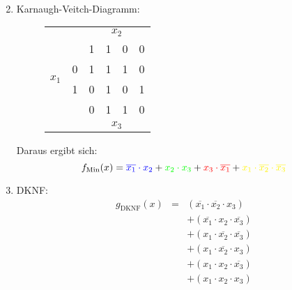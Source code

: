 \documentclass[DIN, pagenumber=false, fontsize=11pt, parskip=half]{scrartcl}
\begin{document}
\begin{enumerate}[label=(\alph*)]
\begin{eqnarray*}
            \end{eqnarray*}
        \item 
            Karnaugh-Veitch-Diagramm:
            \begin{figure}[H]
                \centering
                \begin{tabular}{cc|cccc}
                    & &  & \multicolumn{2}{c}{$x_2$}\\
                    & & 1 & 1 & 0 & 0\\
                    \midrule
                    \multirow{ 2}{*}{$x_1$} & 0 & \cellcolor{blue!25}1 & \cellcolor{mixtureColor!25}1 & \cellcolor{red!25}1 & 0\\
                     & 1 & 0 & \cellcolor{green!25}1 & 0 & \cellcolor{yellow!25}1\\
                    \midrule
                    & & 0 & 1 & 1 & 0\\
                    & &  & \multicolumn{2}{c}{$x_3$}\\
                \end{tabular}
            \end{figure}
            Daraus ergibt sich:
            \begin{equation*}
                f_\text{Min}(x) = \textcolor{blue}{\overline{x_1}\cdot x_2} + 
                \textcolor{green}{x_2 \cdot x_3} + 
                \textcolor{red}{x_3 \cdot \overline{x_1}}+
                \textcolor{yellow}{x_1 \cdot \overline{x_2} \cdot \overline{x_3}}
            \end{equation*}
        \item
            DKNF:
            \begin{eqnarray*}
                g_\text{DKNF}(x) &=& (\overline{x_1} \cdot \overline{x_2} \cdot x_3)\\
                &&+ (\overline{x_1} \cdot x_2 \cdot \overline{x_3})\\
                &&+ (x_1 \cdot \overline{x_2} \cdot \overline{x_3})\\
                &&+ (x_1 \cdot \overline{x_2} \cdot x_3)\\
                &&+ (x_1 \cdot x_2  \cdot \overline{x_3})\\
                &&+ (x_1 \cdot x_2 \cdot x_3)
            \end{eqnarray*}


\end{enumerate}
\end{document}
